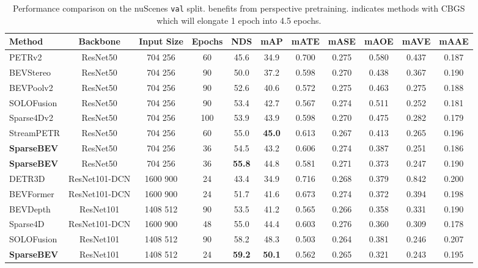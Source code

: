 \documentclass[10pt,twocolumn,letterpaper]{article}
\begin{document}
\setlength{\tabcolsep}{4pt}
\begin{table*}[t]
   \centering
   \begin{tabular}{l|ccc|cc|ccccc}
      \toprule
      Method & Backbone & Input Size & Epochs & NDS & mAP & mATE & mASE & mAOE & mAVE & mAAE \\
      \midrule
PETRv2 \cite{petrv2}         & ResNet50 & 704  256 & 60            & 45.6 & 34.9 & 0.700 & 0.275 & 0.580 & 0.437 & 0.187 \\
      BEVStereo \cite{bevstereo}   & ResNet50 & 704  256 & 90  & 50.0 & 37.2 & 0.598 & 0.270 & 0.438 & 0.367 & 0.190 \\
      BEVPoolv2 \cite{bevpoolv2}   & ResNet50 & 704  256 & 90  & 52.6 & 40.6 & 0.572 & 0.275 & 0.463 & 0.275 & 0.188 \\
      SOLOFusion \cite{solofusion} & ResNet50 & 704  256 & 90  & 53.4 & 42.7 & 0.567 & 0.274 & 0.511 & 0.252 & 0.181 \\
      Sparse4Dv2 \cite{sparse4dv2} & ResNet50 & 704  256 & 100 & 53.9 & 43.9 & 0.598 & 0.270 & 0.475 & 0.282 & 0.179 \\
      StreamPETR  \cite{streampetr} & ResNet50 & 704  256 & 60 & 55.0 & \textbf{45.0} & 0.613 & 0.267 & 0.413 & 0.265 & 0.196  \\
      \rowcolor{Gray}
      \textbf{SparseBEV}           & ResNet50 & 704  256 & 36 & 54.5 & 43.2 & 0.606 & 0.274 & 0.387 & 0.251 & 0.186 \\
      \rowcolor{Gray}
      \textbf{SparseBEV}  & ResNet50 & 704  256 & 36 & \textbf{55.8} & 44.8 & 0.581 & 0.271 & 0.373 & 0.247 & 0.190 \\
      \midrule
      DETR3D  \cite{detr3d}       & ResNet101-DCN & 1600  900 & 24 & 43.4 & 34.9 & 0.716 & 0.268 & 0.379 & 0.842 & 0.200 \\
      BEVFormer  \cite{bevformer} & ResNet101-DCN & 1600  900 & 24 & 51.7 & 41.6 & 0.673 & 0.274 & 0.372 & 0.394 & 0.198 \\
      BEVDepth \cite{bevdepth}             & ResNet101 & 1408  512 & 90  & 53.5 & 41.2 & 0.565 & 0.266 & 0.358 & 0.331 & 0.190 \\
      Sparse4D  \cite{sparse4d}   & ResNet101-DCN & 1600  900 & 48 & 55.0 & 44.4 & 0.603 & 0.276 & 0.360 & 0.309 & 0.178 \\
      SOLOFusion \cite{solofusion}         & ResNet101 & 1408  512 & 90  & 58.2 & 48.3 & 0.503 & 0.264 & 0.381 & 0.246 & 0.207 \\
      \rowcolor{Gray}
      \textbf{SparseBEV}          & ResNet101 & 1408  512 & 24 & \textbf{59.2} & \textbf{50.1} & 0.562 & 0.265 & 0.321 & 0.243 & 0.195 \\
      \bottomrule
   \end{tabular}
   \vspace{-5pt}
   \caption{Performance comparison on the nuScenes \texttt{val} split.  benefits from perspective pretraining.  indicates methods with CBGS \cite{cbgs} which will elongate 1 epoch into 4.5 epochs.}
   \label{table:nuscenes_val}
\end{table*}
\end{document}
